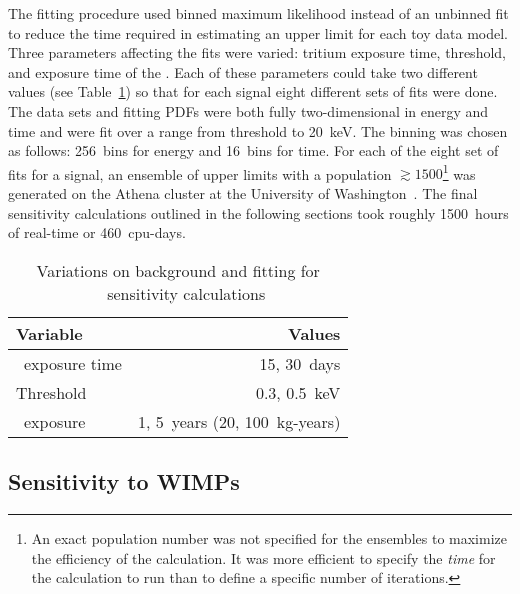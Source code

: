 	The fitting procedure used binned maximum likelihood instead of an unbinned fit to reduce the time required in estimating an upper limit for each toy data model.  Three parameters affecting the fits were varied: tritium exposure time, threshold, and exposure time of the \minmod.  Each of these parameters could take two different values (see Table~\ref{tab:SensFitValues}) so that for each signal eight different sets of fits were done.  The data sets and fitting PDFs were both fully two-dimensional in energy and time and were fit over a range from threshold to 20~keV.  The binning was chosen as follows: 256~bins for energy and 16~bins for time.  For each of the eight set of fits for a signal, an ensemble of upper limits with a population $\gtrsim1500$\footnote{ An exact population number was not specified for the ensembles to maximize the efficiency of the calculation.  It was more efficient to specify the \emph{time} for the calculation to run than to define a specific number of iterations.} was generated on the Athena cluster at the University of Washington~\cite{Athena}.  The final sensitivity calculations outlined in the following sections took roughly 1500~hours of real-time or 460~cpu-days.
	
			\begin{table}
				\centering
				\begin{tabular}{l r}
					\toprule
					Variable & Values \\
					\midrule
					\hthree~exposure time & 15, 30~days \\
					Threshold & 0.3, 0.5~keV \\
					\minmod~exposure & 1, 5~years (20, 100~kg-years) \\
					\bottomrule 
				\end{tabular}				
				\caption[Variations on background and fitting for \MJ~\minmod~sensitivity calculations]
				{Variations on background and fitting for \MJ~\minmod~sensitivity calculations}
				\label{tab:SensFitValues}
			\end{table}		
		
		\subsection{Sensitivity to WIMPs}
		\label{sec:MJSensitivityToWIMP}
		

